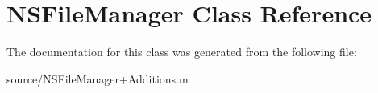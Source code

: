\hypertarget{class_n_s_file_manager}{
\section{NSFileManager Class Reference}
\label{class_n_s_file_manager}
}


The documentation for this class was generated from the following file:\begin{DoxyCompactItemize}
\item 
source/NSFileManager+Additions.m\end{DoxyCompactItemize}
